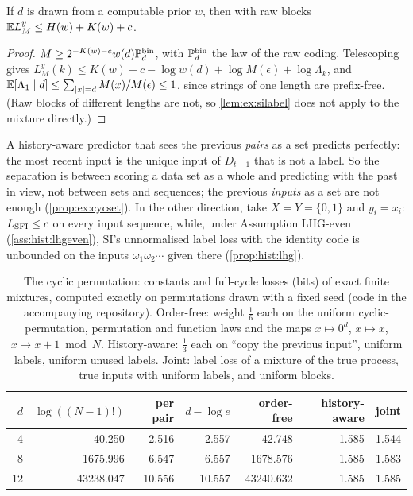\begin{remark}\label{rem:ex:prior}
If $d$ is drawn from a computable prior $w$, then with raw blocks $\mathbb{E} L^y_M\le H(w)+K(w)+c$.
\end{remark}

\begin{proof}
$M\ge2^{-K(w)-c}w(d)\mathbb{P}^{\rm bin}_d$, with $\mathbb{P}^{\rm bin}_d$ the law of the raw coding. Telescoping gives $L^y_M(k)\le K(w)+c-\log w(d)+\log M(\epsilon)+\log\Lambda_k$, and $\mathbb{E}[\Lambda_1\mid d]\le\sum_{|x|=d}M(x)/M(\epsilon)\le1$, since strings of one length are prefix-free. (Raw blocks of different lengths are not, so \cref{lem:ex:silabel} does not apply to the mixture directly.)
\end{proof}

\begin{remark}\label{rem:ex:where}
A history-aware predictor that sees the previous \emph{pairs} as a set predicts perfectly: the most recent input is the unique input of $D_{t-1}$ that is not a label. So the separation is between scoring a data set as a whole and predicting with the past in view, not between sets and sequences; the previous \emph{inputs} as a set are not enough (\cref{prop:ex:cycset}). In the other direction, take $X=Y=\{0,1\}$ and $y_i=x_i$: $L_{\mathrm{SFI}}\le c$ on every input sequence, while, under Assumption LHG-even (\cref{ass:hist:lhgeven}), SI's unnormalised label loss with the identity code is unbounded on the inputs $\omega_1\omega_2\cdots$ given there (\cref{prop:hist:lhg}).
\end{remark}

\begin{table}[t]
\centering\small
\begin{tabular}{rrrrrrr}
\toprule
$d$ & $\log((N-1)!)$ & per pair & $d-\log e$ & order-free & history-aware & joint\\
\midrule
4 & 40.250 & 2.516 & 2.557 & 42.748 & 1.585 & 1.544\\
8 & 1675.996 & 6.547 & 6.557 & 1678.576 & 1.585 & 1.583\\
12 & 43238.047 & 10.556 & 10.557 & 43240.632 & 1.585 & 1.585\\
\bottomrule
\end{tabular}

\caption[The cyclic permutation: constants and finite mixtures]{The cyclic permutation: constants and full-cycle losses (bits) of exact finite mixtures, computed exactly on permutations drawn with a fixed seed (code in the accompanying repository). Order-free: weight $\frac16$ each on the uniform cyclic-permutation, permutation and function laws and the maps $x\mapsto0^d$, $x\mapsto x$, $x\mapsto x+1\bmod N$. History-aware: $\frac13$ each on ``copy the previous input'', uniform labels, uniform unused labels. Joint: label loss of a mixture of the true process, true inputs with uniform labels, and uniform blocks.}\label{tab:ex:cycle}
\end{table}

